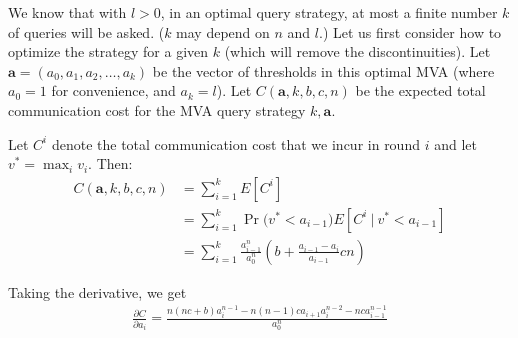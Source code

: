 We know that with $l>0$, in an optimal query strategy, at most a finite
number $k$ of queries will be asked.  ($k$ may depend on $n$ and $l$.)  Let
us first consider how to optimize the strategy for a given $k$ (which will
remove the discontinuities).
Let $\boldsymbol a = (a_0, a_1, a_2, \ldots, a_k)$ be the vector of
thresholds in this optimal MVA (where $a_0 = 1$ for convenience, and $a_k =
l$).
Let $C(\boldsymbol a, k, b, c,
n)$ be the expected total communication cost 
for the MVA query strategy
$k, \boldsymbol a$.

Let $C^i$ denote the total communication cost that we incur in
round $i$ and let 
$v^* = \max_i v_i$. Then:
\begin{align}
C(\boldsymbol a, k, b, c, n) &= \sum_{i=1}^k E[ C^i ] \nonumber \\
  &= \sum_{i=1}^{k} \Pr\big( v^* < a_{i-1} \big) E[C^i ~|~ v^* < a_{i-1}] \nonumber \\
  &= \sum_{i=1}^{k} \frac{a_{i-1}^n}{a_0^n} \left( b + \frac{a_{i-1}-a_{i}}{a_{i-1}} cn \right)
  \label{eq:C_general_simplified}
\end{align}

Taking the derivative, we get
\begin{align}
 \frac{\partial C}{\partial a_i} = \frac{
	n(nc+b)a_i^{n-1}-n(n-1)ca_{i+1}a_i^{n-2}-nca_{i-1}^{n-1} }{a_0^n}
	\label{eq:diff_C_general}
\end{align}

